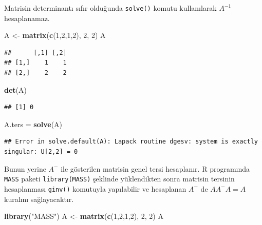\documentclass[
]{book}
\newenvironment{Shaded}{\begin{snugshade}}{\end{snugshade}}
\newcommand{\DecValTok}[1]{\textcolor[rgb]{0.00,0.00,0.81}{#1}}
\newcommand{\FunctionTok}[1]{\textcolor[rgb]{0.13,0.29,0.53}{\textbf{#1}}}
\newcommand{\NormalTok}[1]{#1}
\newcommand{\OtherTok}[1]{\textcolor[rgb]{0.56,0.35,0.01}{#1}}
\newcommand{\StringTok}[1]{\textcolor[rgb]{0.31,0.60,0.02}{#1}}
\begin{document}
Matrisin determinantı sıfır olduğunda \texttt{solve()} komutu kullanılarak \(A^{-1}\) hesaplanamaz.

\begin{Shaded}
\begin{Highlighting}[]
\NormalTok{ A }\OtherTok{\textless{}{-}} \FunctionTok{matrix}\NormalTok{(}\FunctionTok{c}\NormalTok{(}\DecValTok{1}\NormalTok{,}\DecValTok{2}\NormalTok{,}\DecValTok{1}\NormalTok{,}\DecValTok{2}\NormalTok{), }\DecValTok{2}\NormalTok{, }\DecValTok{2}\NormalTok{) }
\NormalTok{ A }
\end{Highlighting}
\end{Shaded}

\begin{verbatim}
##      [,1] [,2]
## [1,]    1    1
## [2,]    2    2
\end{verbatim}

\begin{Shaded}
\begin{Highlighting}[]
 \FunctionTok{det}\NormalTok{(A)}
\end{Highlighting}
\end{Shaded}

\begin{verbatim}
## [1] 0
\end{verbatim}

\begin{Shaded}
\begin{Highlighting}[]
\NormalTok{ A.ters }\OtherTok{=} \FunctionTok{solve}\NormalTok{(A)}
\end{Highlighting}
\end{Shaded}

\begin{verbatim}
## Error in solve.default(A): Lapack routine dgesv: system is exactly singular: U[2,2] = 0
\end{verbatim}

Bunun yerine \(A^{-}\) ile gösterilen matrisin genel tersi hesaplanır. R programında \texttt{MASS} paketi \texttt{library(MASS)} şeklinde yüklendikten sonra matrisin tersinin hesaplanması \texttt{ginv()} komutuyla yapılabilir ve hesaplanan \(A^{-}\) de \(AA^{-}A=A\) kuralını sağlayacaktır.

\begin{Shaded}
\begin{Highlighting}[]
 \FunctionTok{library}\NormalTok{(}\StringTok{"MASS"}\NormalTok{)}
\NormalTok{ A }\OtherTok{\textless{}{-}} \FunctionTok{matrix}\NormalTok{(}\FunctionTok{c}\NormalTok{(}\DecValTok{1}\NormalTok{,}\DecValTok{2}\NormalTok{,}\DecValTok{1}\NormalTok{,}\DecValTok{2}\NormalTok{), }\DecValTok{2}\NormalTok{, }\DecValTok{2}\NormalTok{) }
\NormalTok{ A }
\end{Highlighting}
\end{Shaded}
\end{document}
